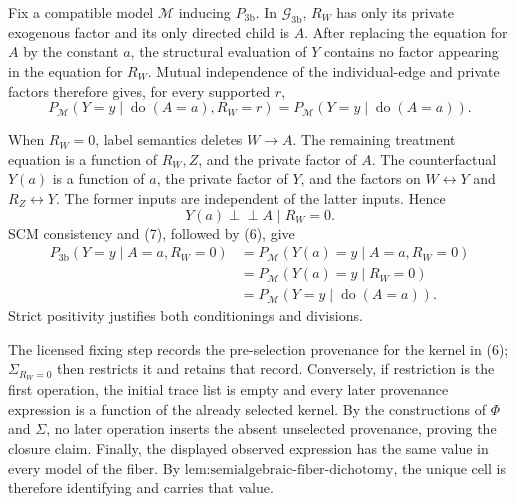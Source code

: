 Fix a compatible model \(\mathcal M\) inducing \(P_{\mathrm{3b}}\). In \(\mathcal G_{\mathrm{3b}}\), \(R_W\) has only its private exogenous factor and its only directed child is \(A\). After replacing the equation for \(A\) by the constant \(a\), the structural evaluation of \(Y\) contains no factor appearing in the equation for \(R_W\). Mutual independence of the individual-edge and private factors therefore gives, for every supported \(r\),
\[
P_{\mathcal M}(Y=y\mid\operatorname{do}(A=a),R_W=r)
=P_{\mathcal M}(Y=y\mid\operatorname{do}(A=a)).
\tag{6}
\]

When \(R_W=0\), label semantics deletes \(W\to A\). The remaining treatment equation is a function of \(R_W,Z\), and the private factor of \(A\). The counterfactual \(Y(a)\) is a function of \(a\), the private factor of \(Y\), and the factors on \(W\leftrightarrow Y\) and \(R_Z\leftrightarrow Y\). The former inputs are independent of the latter inputs. Hence
\[
Y(a)\mathbin{\perp\!\!\!\perp}A\mid R_W=0.
\tag{7}
\]
SCM consistency and (7), followed by (6), give
\[
\begin{aligned}
P_{\mathrm{3b}}(Y=y\mid A=a,R_W=0)
&=P_{\mathcal M}(Y(a)=y\mid A=a,R_W=0)\\
&=P_{\mathcal M}(Y(a)=y\mid R_W=0)\\
&=P_{\mathcal M}(Y=y\mid\operatorname{do}(A=a)).
\end{aligned}
\]
Strict positivity justifies both conditionings and divisions.

The licensed fixing step records the pre-selection provenance for the kernel in (6); \(\Sigma_{R_W=0}\) then restricts it and retains that record. Conversely, if restriction is the first operation, the initial trace list is empty and every later provenance expression is a function of the already selected kernel. By the constructions of \(\Phi\) and \(\Sigma\), no later operation inserts the absent unselected provenance, proving the closure claim. Finally, the displayed observed expression has the same value in every model of the fiber. By \(\text{lem:semialgebraic-fiber-dichotomy}\), the unique cell is therefore identifying and carries that value.